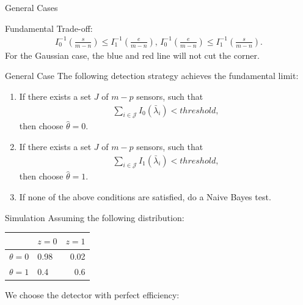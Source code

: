 \documentclass[10pt]{beamer}
\newcommand{\tikzdir}[1]{#1.tikz}
\newcommand{\inputtikz}[1]{}}
\begin{document}
\begin{frame}{General Cases}
  \begin{center}
    \inputtikz{fun_lim}
  \end{center}
  Fundamental Trade-off:
  \begin{align*}
I_0^{-1}\left(\frac{s}{m-n}\right)\leq I_1^{-1}\left(\frac{e}{m-n}\right),\, I_0^{-1}\left(\frac{e}{m-n}\right)\leq I_1^{-1}\left(\frac{s}{m-n}\right). 
  \end{align*}
  For the Gaussian case, the blue and red line will not cut the corner.
\end{frame}

\begin{frame}{General Case}
  The following detection strategy achieves the fundamental limit:
  \begin{enumerate}
  \item If there exists a set $J$ of $m-p$ sensors, such that
    \begin{align*}
      \sum_{i\in \mathcal J}I_0(\bar \lambda_i) < threshold,
    \end{align*}
    then choose $\hat \theta = 0$. 
  \item If there exists a set $J$ of $m-p$ sensors, such that
    \begin{align*}
      \sum_{i\in \mathcal J}I_1(\bar \lambda_i) < threshold,
    \end{align*}
    then choose $\hat \theta = 1$. 
  \item If none of the above conditions are satisfied, do a Naive Bayes test.
  \end{enumerate}
\end{frame}

\begin{frame}{Simulation}
  Assuming the following distribution:
  \begin{center}
    \begin{tabular}{@{}llr@{}}
      \toprule
      & $z = 0$ & $z=1$\\
      \midrule
      $\theta=0$ &0.98&0.02\\
      $\theta=1$ &0.4&0.6\\
      \bottomrule
    \end{tabular}
  \end{center}  
  We choose the detector with perfect efficiency:
  \begin{center}
    \inputtikz{finite_time}
  \end{center}
\end{frame}
\end{document}
